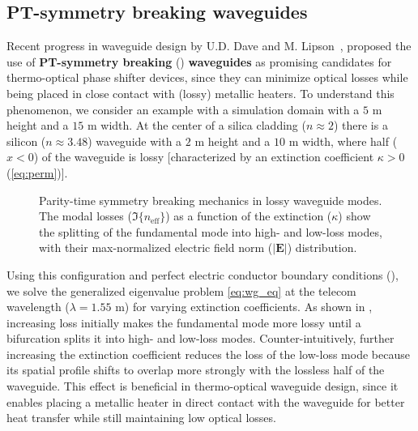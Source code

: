  \subsection*{PT-symmetry breaking waveguides}
 Recent progress in waveguide design by U.D. Dave and M. Lipson~\cite{lipson}, proposed the use of \textbf{PT-symmetry breaking} () \textbf{waveguides} as promising candidates for
 thermo-optical phase shifter devices, since they can minimize optical losses while being placed in close contact with (lossy) metallic heaters. To understand this phenomenon, we consider an example with a 
 simulation domain with a $5$ \textmu m height and a $15$ \textmu m width. At the center of a silica cladding ($n\approx 2$) there is a silicon ($n \approx 3.48$) waveguide with a $2$ \textmu m height and 
 a $10$ \textmu m width, where half ($x<0$) of the waveguide is lossy [characterized by an extinction coefficient $\kappa>0$ (\eqref{eq:perm})].

\begin{figure}[tb]
    \centering
    \caption{Parity-time symmetry breaking mechanics in lossy waveguide modes. The modal losses ($\Im\{n_\text{eff}\}$) as a function of the extinction ($\kappa$) show the splitting of the fundamental mode into 
    high- and low-loss modes, with their max-normalized electric field norm ($\vert \mathbf{E} \vert$) distribution.}
    \label{fig:pt}
\end{figure}

Using this configuration and perfect electric conductor boundary conditions (), we solve the generalized eigenvalue
 problem \eqref{eq:wg_eq} at the telecom wavelength ($\lambda = 1.55$ \textmu m) for varying extinction coefficients. 
 As shown in , increasing loss initially makes the fundamental mode more lossy until a bifurcation splits
  it into high- and low-loss modes. Counter-intuitively, further increasing the extinction coefficient reduces the loss of the low-loss mode 
  because its spatial profile shifts to overlap more strongly with the lossless half of the waveguide.
   This effect is beneficial in thermo-optical waveguide design, since it  enables placing a metallic heater in direct contact with the waveguide for better heat transfer while still
    maintaining low optical losses.

